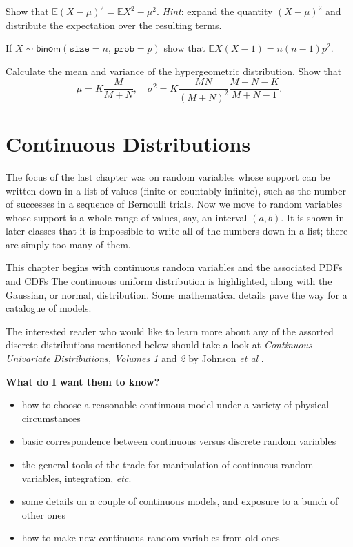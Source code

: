 \documentclass[captions=tableheading]{scrbook}
\begin{document}
\begin{xca}
Show that \(\mathbb{E}(X-\mu)^{2}=\mathbb{E} X^{2}-\mu^{2}\). \emph{Hint}: expand the quantity \((X-\mu)^{2}\) and distribute the expectation over the resulting terms.
\end{xca}

\begin{xca}
If \(X\sim\mathsf{binom}(\mathtt{size}=n,\,\mathtt{prob}=p)\) show that \(\mathbb{E} X(X-1)=n(n-1)p^{2}\).
\end{xca}

\begin{xca}
Calculate the mean and variance of the hypergeometric distribution. Show that 
\begin{equation}
\mu=K\frac{M}{M+N},\quad\sigma^{2}=K\frac{MN}{(M+N)^{2}}\frac{M+N-K}{M+N-1}.
\end{equation}
\end{xca}
\chapter{Continuous Distributions}
\label{sec-6}
\label{cha-Continuous-Distributions}


\noindent 
The focus of the last chapter was on random variables whose support can be written down in a list of values (finite or countably infinite), such as the number of successes in a sequence of Bernoulli trials. Now we move to random variables whose support is a whole range of values, say, an interval \((a,b)\). It is shown in later classes that it is impossible to write all of the numbers down in a list; there are simply too many of them.

This chapter begins with continuous random variables and the associated PDFs and CDFs The continuous uniform distribution is highlighted, along with the Gaussian, or normal, distribution. Some mathematical details pave the way for a catalogue of models.

The interested reader who would like to learn more about any of the assorted discrete distributions mentioned below should take a look at \emph{Continuous Univariate Distributions, Volumes 1} and \emph{2} by Johnson \emph{et al} \cite{Johnson1994,Johnson1995}.

\textbf{What do I want them to know?}
\begin{itemize}
\item how to choose a reasonable continuous model under a variety of physical circumstances
\item basic correspondence between continuous versus discrete random variables
\item the general tools of the trade for manipulation of continuous random variables, integration, \emph{etc}.
\item some details on a couple of continuous models, and exposure to a bunch of other ones
\item how to make new continuous random variables from old ones
\end{itemize}
\end{document}
